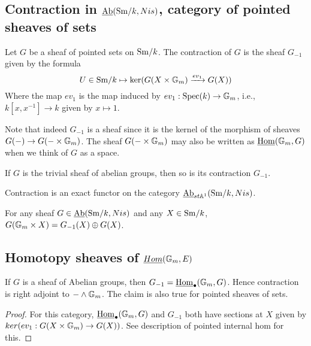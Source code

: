 \documentclass{amsart}%
\begin{document}
\subsection{Contraction in $\operatorname{\underline{Ab}}(\mathrm{Sm}/k,Nis)$, category of pointed
  sheaves of sets}

\begin{definition}
  Let $G$ be a sheaf of pointed sets on $\mathrm{Sm}/k$. The contraction of
  $G$ is the sheaf $G_{-1}$ given by the formula
  \begin{equation*}
    U \in \mathrm{Sm}/k \mapsto \ker( G(X\times \mathbb{G}_m) \xrightarrow{ev_1} G(X))
  \end{equation*}
  Where the map $ev_1$ is the map induced by
  $ev_1 : \operatorname{Spec}(k) \to \mathbb{G}_m$, i.e., $k[x,x^{-1}] \to k$ given by
  $x\mapsto 1$.

  Note that indeed $G_{-1}$ is a sheaf since it is the kernel of the
  morphism of sheaves $G(-) \to G(-\times \mathbb{G}_m)$. The sheaf
  $G(-\times \mathbb{G}_m)$ may also be written as
  $\underline{\operatorname{Hom}}(\mathbb{G}_m, G)$ when we think of $G$ as a
  space.
\end{definition}

\begin{proposition}
  If $G$ is the trivial sheaf of abelian groups, then so is its
  contraction $G_{-1}$.
\end{proposition}

\begin{proposition}
  Contraction is an exact functor on the category
  $\operatorname{\underline{Ab}}_{st\mathbb{A}^1}(\mathrm{Sm}/k,Nis)$.

  For any sheaf $G \in \operatorname{\underline{Ab}}(\mathrm{Sm}/k,Nis)$ and any $X \in \mathrm{Sm}/k$,
  $G(\mathbb{G}_m\times X) = G_{-1}(X) \oplus G(X)$.
\end{proposition}


\subsection{Homotopy sheaves of $\underline{Hom}(\mathbb{G}_m, E)$}

\begin{proposition}
  If $G$ is a sheaf of Abelian groups, then
  $G_{-1} = \underline{\operatorname{Hom}}_{\bullet}(\mathbb{G}_m, G)$.  Hence contraction
  is right adjoint to $- \wedge \mathbb{G}_m$. The claim is also true for
  pointed sheaves of sets.
\end{proposition}

\begin{proof}
  For this category, $\underline{\operatorname{Hom}}_{\bullet}(\mathbb{G}_m, G)$ and
  $G_{-1}$ both have sections at $X$ given by
  $ker( ev_1 : G(X \times \mathbb{G}_m) \to G(X))$. See description of
  pointed internal hom for this. 
\end{proof}
\end{document}
